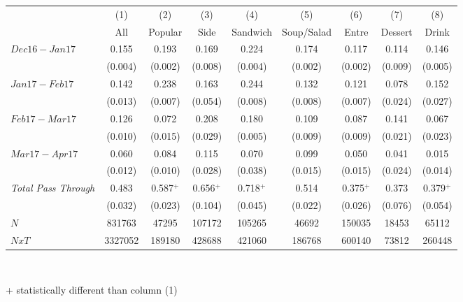 \begin{center}
\begin{tabular}{lcccccccc}
\hline  & (1) & (2) & (3) & (4) & (5) & (6) & (7) & (8)\\
 & All & Popular & Side & Sandwich & Soup/Salad & Entre & Dessert & Drink\\
\hline  $ Dec16-Jan17 $  & 0.155 & 0.193 & 0.169 & 0.224 & 0.174 & 0.117 & 0.114 & 0.146\\
 & (0.004) & (0.002) & (0.008) & (0.004) & (0.002) & (0.002) & (0.009) & (0.005)\\
 $ Jan17-Feb17 $  & 0.142 & 0.238 & 0.163 & 0.244 & 0.132 & 0.121 & 0.078 & 0.152\\
 & (0.013) & (0.007) & (0.054) & (0.008) & (0.008) & (0.007) & (0.024) & (0.027)\\
 $ Feb17-Mar17 $  & 0.126 & 0.072 & 0.208 & 0.180 & 0.109 & 0.087 & 0.141 & 0.067\\
 & (0.010) & (0.015) & (0.029) & (0.005) & (0.009) & (0.009) & (0.021) & (0.023)\\
 $ Mar17-Apr17 $  & 0.060 & 0.084 & 0.115 & 0.070 & 0.099 & 0.050 & 0.041 & 0.015\\
 & (0.012) & (0.010) & (0.028) & (0.038) & (0.015) & (0.015) & (0.024) & (0.014)\\
\hline \textit{Total Pass Through} & 0.483 & 0.587$^+$ & 0.656$^+$ & 0.718$^+$ & 0.514 & 0.375$^+$ & 0.373 & 0.379$^+$\\
  & (0.032) & (0.023) & (0.104) & (0.045) & (0.022) & (0.026) & (0.076) & (0.054)\\
\hline  $ N $  & 831763 & 47295 & 107172 & 105265 & 46692 & 150035 & 18453 & 65112\\
 $ NxT $  & 3327052 & 189180 & 428688 & 421060 & 186768 & 600140 & 73812 & 260448\\
\hline\end{tabular}\\
\begin{tiny} + statistically different than column (1)\end{tiny}\\
\end{center}
